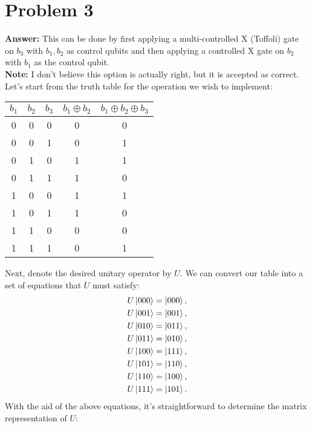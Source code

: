 \documentclass[10pt]{article}
\begin{document}
\section*{Problem 3}
\label{sec:org737f7ad}
\textbf{Answer:} This can be done by first applying a multi-controlled X (Toffoli) gate
on \(b_3\) with \(b_1,b_2\) as control qubits and then applying a controlled
X gate on \(b_2\) with \(b_1\) as the control qubit.\\
\textbf{Note:} I don't believe this option is actually right, but it is accepted as
correct.\\

Let's start from the truth table for the operation we wish to implement:
\begin{center}
\begin{tabular}{|c|c|c|c|c|}
\hline
\(b_1\) & \(b_2\) & \(b_3\) & \(b_1\oplus b_2\) & \(b_1\oplus b_2\oplus b_3\)\\
\hline
0 & 0 & 0 & 0 & 0\\
0 & 0 & 1 & 0 & 1\\
0 & 1 & 0 & 1 & 1\\
0 & 1 & 1 & 1 & 0\\
1 & 0 & 0 & 1 & 1\\
1 & 0 & 1 & 1 & 0\\
1 & 1 & 0 & 0 & 0\\
1 & 1 & 1 & 0 & 1\\
\hline
\end{tabular}
\end{center}
Next, denote the desired unitary operator by \(U\). We can convert our table
into a set of equations that \(U\) must satisfy:
\begin{align}
  \begin{split}
    U\ket{000}&=\ket{000},\\
    U\ket{001}&=\ket{001},\\
    U\ket{010}&=\ket{011},\\
    U\ket{011}&=\ket{010},\\
    U\ket{100}&=\ket{111},\\
    U\ket{101}&=\ket{110},\\
    U\ket{110}&=\ket{100},\\
    U\ket{111}&=\ket{101}.
  \end{split}
\end{align}
With the aid of the above equations, it's straightforward to determine the
matrix representation of \(U\):
\end{document}
